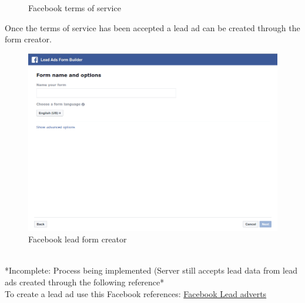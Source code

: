 \documentclass{article}
\begin{document}
\begin{enumerate}
\begin{figure}[H]
					\caption{Facebook terms of service}
					\label{fig:facebookTermsOfService}
				\end{figure}
				Once the terms of service has been accepted a lead ad can be created through the form creator.\\
				\begin{figure}
					\centering
						\includegraphics[width=\textwidth]{images/facebook_lead_form_creator.png}
					\caption{Facebook lead form creator}
					\label{fig:facebookLeadFormCreator}
				\end{figure}\\
				*Incomplete: Process being implemented (Server still accepts lead data from lead ads created through the following reference*\\
				To create a lead ad use this Facebook references: \href{https://www.facebook.com/business/a/lead-ads}{Facebook Lead adverts}
			\end{enumerate}

\end{document}
